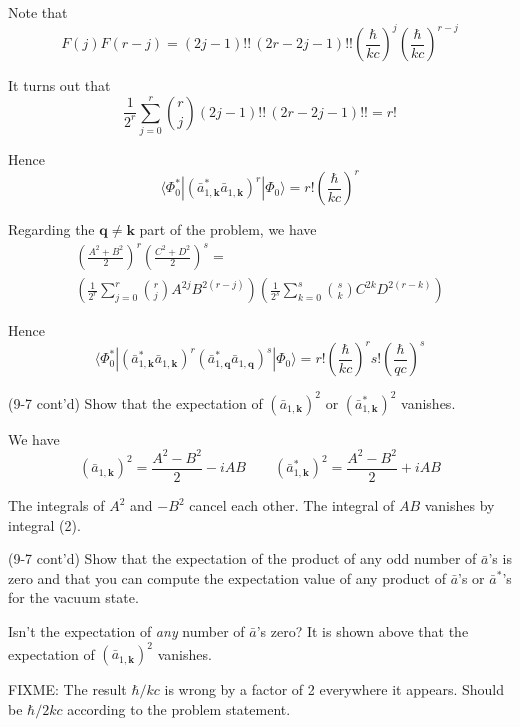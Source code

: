 \documentclass[12pt]{article}
\begin{document}
Note that
\begin{equation*}
F(j)F(r-j)=
(2j-1)!!\,(2r-2j-1)!!
\left(\frac{\hbar}{kc}\right)^j
\left(\frac{\hbar}{kc}\right)^{r-j}
\end{equation*}

It turns out that
\begin{equation*}
\frac{1}{2^r}\sum_{j=0}^r\binom{r}{j}(2j-1)!!\,(2r-2j-1)!!=r!
\end{equation*}

Hence
\begin{equation*}
\langle\Phi_0^*|(\bar a_{1,\mathbf k}^*\bar a_{1,\mathbf k})^r|\Phi_0\rangle
=r!\left(\frac{\hbar}{kc}\right)^r
\end{equation*}

Regarding the $\mathbf q\ne\mathbf k$ part of the problem, we have
\begin{multline*}
\left(\frac{A^2+B^2}{2}\right)^r\left(\frac{C^2+D^2}{2}\right)^s={}
\\
\left(\frac{1}{2^r}\sum_{j=0}^r\binom{r}{j}A^{2j}B^{2(r-j)}\right)
\left(\frac{1}{2^s}\sum_{k=0}^s\binom{s}{k}C^{2k}D^{2(r-k)}\right)
\end{multline*}

Hence
\begin{equation*}
\langle\Phi_0^*|
(\bar a_{1,\mathbf k}^*\bar a_{1,\mathbf k})^r
(\bar a_{1,\mathbf q}^*\bar a_{1,\mathbf q})^s
|\Phi_0\rangle
=r!\left(\frac{\hbar}{kc}\right)^r
s!\left(\frac{\hbar}{qc}\right)^s
\end{equation*}

(9-7 cont'd)
Show that the expectation of 
$(\bar a_{1,\mathbf k})^2$ or
$(\bar a_{1,\mathbf k}^*)^2$ vanishes.

\bigskip
We have
\begin{equation*}
(\bar a_{1,\mathbf k})^2=\frac{A^2-B^2}{2}-iAB
\qquad
(\bar a_{1,\mathbf k}^*)^2=\frac{A^2-B^2}{2}+iAB
\end{equation*}

The integrals of $A^2$ and $-B^2$ cancel each other.
The integral of $AB$ vanishes by integral (2).

\bigskip
(9-7 cont'd)
Show that the expectation of the product of any odd number of
$\bar a$'s is zero and that you can compute the expectation value of
any product of $\bar a$'s or $\bar a^*$'s for the vacuum state.

\bigskip
Isn't the expectation of {\it any} number of $\bar a$'s zero?
It is shown above that the expectation of $(\bar a_{1,\mathbf k})^2$ vanishes.

\bigskip
FIXME: The result $\hbar/kc$ is wrong by a factor of 2 everywhere it appears.
Should be $\hbar/2kc$ according to the problem statement.
\end{document}
